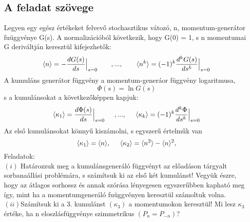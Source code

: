\documentclass[12pt]{article}
\begin{document}
\subsection*{A feladat szövege}
Legyen egy egész értékeket felvevő stochasztikus vátozó, n, momentum-generátor fuüggvénye G(s). A normalizációból következik, hogy G(0) = 1, s n momentumai G deriváltján keresztül kifejezhetők:
$$\langle n\rangle = - \frac{dG(s)}{ds} \Big |_{\substack{ s=0 }}\hspace{0.7cm}, ...,\hspace{0.7cm} \langle n^k \rangle = (-1)^k\frac{d^kG(s)}{ds^k} \Big |_{\substack{ s=0 }}$$
A kumuláns generátor függvény a momentum-generáor függvény logaritmusa,
$$ \Phi (s) = \ln{G(s)}$$
s a kumulánsokat a következőképpen kapjuk:
$$\langle \kappa_1 \rangle = \frac{d\Phi(s)}{ds} \Big |_{\substack{ s=0 }} \hspace{0.5cm}, ..., \hspace{0.5cm} \langle \kappa_k \rangle = (-1)^k\frac{d^k\Phi}{ds^k}\Big |_{\substack{s = 0}}$$
Az első kumulánsokat könnyű kiszámolni, s egyszerű értelműk van
$$\langle \kappa_1\rangle = \langle n\rangle,  \hspace{0.5cm} \langle \kappa_2\rangle = \langle n^2\rangle -\langle n\rangle ^2,$$
Feladatok:\\
$(i)$ Határozzuk meg a kumulánsgeneráló függvényt az előadáson tárgyalt sorbanaállási problémára, s számítsuk ki az első két kumulánst! Vegyük észre, hogy az átlagos sorhossz és annak szórása lényegesen egyszerűbben kapható meg így, mint ha a momentumgeneráló fuüggvényen keresztül számoltuk volna.\\
$(ii)$Számítsuk ki a 3. kumulánst $(\kappa_3)$ a momentumokon keresztül! Mi lesz $\kappa_3$ értéke, ha n eloszlásfüggvénye szimmetrikus $ (P_n = P_{-n})$?
\end{document}
